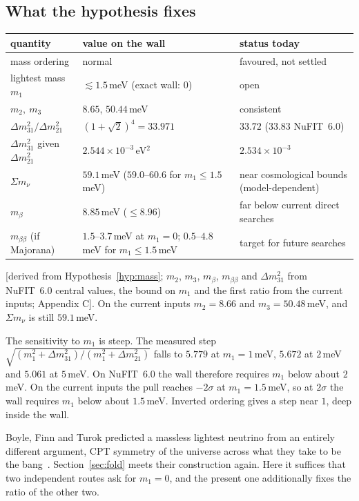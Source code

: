 \documentclass[11pt]{article}
\theoremstyle{definition}\newtheorem{hypothesis}{Hypothesis}\newtheorem{prediction}{Prediction}
\theoremstyle{remark}\newtheorem{remark}[theorem]{Remark}
\newcommand{\grade}[1]{\textsf{\small[#1]}}
\begin{document}
\subsection{What the hypothesis fixes}
\begin{center}\small\begin{tabular}{p{}p{}p{}}\toprule
quantity & value on the wall & status today\\\midrule
mass ordering & normal & favoured, not settled\\
lightest mass $m_1$ & $\lesssim1.5$\,meV (exact wall: $0$) & open\\
$m_2,\ m_3$ & $8.65$, $50.44$\,meV & consistent\\
$\Delta m^2_{31}/\Delta m^2_{21}$ & $(1+\sqrt2)^4=33.971$ & $33.72$ ($33.83$ NuFIT~6.0)\\
$\Delta m^2_{31}$ given $\Delta m^2_{21}$ & $2.544\times10^{-3}$\,eV$^2$ & $2.534\times10^{-3}$\\
$\Sigma m_\nu$ & $59.1$\,meV ($59.0$--$60.6$ for $m_1\le1.5$\,meV) & near cosmological bounds (model-dependent)\\
$m_\beta$ & $8.85$\,meV ($\le8.96$) & far below current direct searches\\
$m_{\beta\beta}$ (if Majorana) & $1.5$--$3.7$\,meV at $m_1=0$; $0.5$--$4.8$\,meV for $m_1\le1.5$\,meV & target for future searches\\\bottomrule\end{tabular}\end{center}
\grade{derived from Hypothesis~\ref{hyp:mass}; $m_2$, $m_3$, $m_\beta$, $m_{\beta\beta}$ and $\Delta m^2_{31}$ from NuFIT~6.0 central values, the bound on $m_1$ and the first ratio from the current inputs; Appendix C}. On the current inputs $m_2=8.66$ and $m_3=50.48$\,meV, and $\Sigma m_\nu$ is still $59.1$\,meV.

The sensitivity to $m_1$ is steep. The measured step $\sqrt{(m_1^2+\Delta m^2_{31})/(m_1^2+\Delta m^2_{21})}$ falls to $5.779$ at $m_1=1$\,meV, $5.672$ at $2$\,meV and $5.061$ at $5$\,meV. On NuFIT~6.0 the wall therefore requires $m_1$ below about $2$\,meV. On the current inputs the pull reaches $-2\sigma$ at $m_1=1.5$\,meV, so at $2\sigma$ the wall requires $m_1$ below about $1.5$\,meV. Inverted ordering gives a step near $1$, deep inside the wall.

Boyle, Finn and Turok predicted a massless lightest neutrino from an entirely different argument, CPT symmetry of the universe across what they take to be the bang~\cite{BFT,BFT2}. Section~\ref{sec:fold} meets their construction again. Here it suffices that two independent routes ask for $m_1=0$, and the present one additionally fixes the ratio of the other two.
\end{document}
